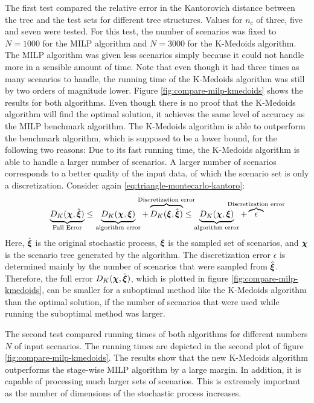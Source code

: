 The first test compared the relative error in the Kantorovich distance between the tree and the test sets for different tree structures.
Values for $n_c$ of three, five and seven were tested.
For this test, the number of scenarios was fixed to $N=1000$ for the MILP algorithm and $N=3000$ for the K-Medoids algorithm.
The MILP algorithm was given less scenarios simply because it could not handle more in a sensible amount of time.
Note that even though it had three times as many scenarios to handle, the running time of the K-Medoids algorithm was still by two orders of magnitude lower.
Figure \ref{fig:compare-milp-kmedoids} shows the results for both algorithms.
Even though there is no proof that the K-Medoids algorithm will find the optimal solution, it achieves the same level of accuracy as the MILP benchmark algorithm.
The K-Medoids algorithm is able to outperform the benchmark algorithm, which is supposed to be a lower bound, for the following two reasons:
Due to its fast running time, the K-Medoids algorithm is able to handle a larger number of scenarios.
A larger number of scenarios corresponds to a better quality of the input data, of which the scenario set is only a discretization.
Consider again \eqref{eq:triangle-montecarlo-kantoro}:
\[\underbrace{D_K(\bs\chi,\hat{\bs\xi})}_{\text{Full Error}} \leq  \underbrace{D_K(\bs\chi, \bs\xi)}_{\text{algorithm error}} + \overbrace{D_K(\bs\xi,\hat{\bs\xi})}^{\mathclap{\text{Discretization error}}}\leq \underbrace{D_K(\bs\chi,\bs\xi)}_{\text{algorithm error}}+ \overbrace{\epsilon}^{\mathclap{\text{Discretization error}}}
\]
Here, $\hat{\boldsymbol\xi}$ is the original stochastic process, $\boldsymbol\xi$ is the sampled set of scenarios, and $\boldsymbol\chi$ is the scenario tree generated by the algorithm.
The discretization error $\epsilon$ is determined mainly by the number of scenarios that were sampled from $\hat{\boldsymbol\xi}$.
Therefore, the full error $D_K(\boldsymbol\chi,\hat{\boldsymbol\xi})$, which is plotted in figure \ref{fig:compare-milp-kmedoids}, can be smaller for a suboptimal method like the K-Medoids algorithm than the optimal solution, if the number of scenarios that were used while running the suboptimal method was larger.

The second test compared running times of both algorithms for different numbers $N$ of input scenarios.
The running times are depicted in the second plot of figure \ref{fig:compare-milp-kmedoids}.
The results show that the new K-Medoids algorithm outperforms the stage-wise MILP algorithm by a large margin.
In addition, it is capable of processing much larger sets of scenarios.
This is extremely important as the number of dimensions of the stochastic process increases.

